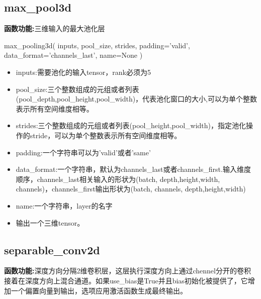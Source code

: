 \subsection{max\_pool3d}
\textbf{函数功能:}三维输入的最大池化层

\begin{python}
max_pooling3d(
    inputs,
    pool_size,
    strides,
    padding='valid',
    data_format='channels_last',
    name=None
)
\end{python}
\begin{itemize}
\item inputs:需要池化的输入tensor，rank必须为5
\item pool\_size:三个整数组成的元组或者列表(pool\_depth,pool\_height,pool\_width)，代表池化窗口的大小,可以为单个整数表示所有空间维度相等。
\item strides:三个整数组成的元组或者列表(pool\_height,pool\_width)，指定池化操作的stride，可以为单个整数表示所有空间维度相等。
\item padding:一个字符串可以为'valid'或者'same'
\item data\_format:一个字符串，默认为channels\_last或者channels\_first.输入维度顺序，channels\_last相关输入的形状为(batch, depth,height,width, channels)，channels\_first输出形状为(batch, channels, depth,height,width)
\item name:一个字符串，layer的名字
\item 输出一个三维tensor。
\end{itemize}
\subsection{separable\_conv2d}
\textbf{函数功能:}深度方向分隔2维卷积层，这层执行深度方向上通过chennel分开的卷积接着在深度方向上混合通道。如果use\_bias是True并且bias初始化被提供了，它增加一个偏置向量到输出，选项应用激活函数生成最终输出。

